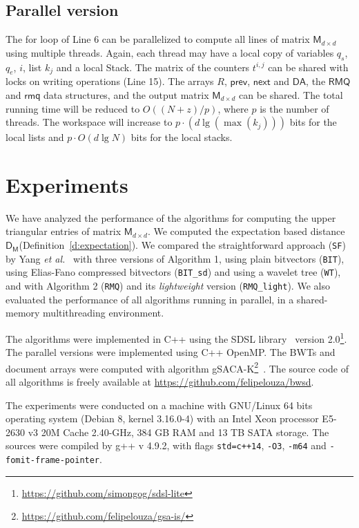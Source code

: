 \documentclass{elsarticle}
\newcommand{\DA}{\ensuremath{\mathsf{DA}}\xspace}
\newcommand{\etal}{{\it et al.}\xspace}
\newcommand{\proc}{\ensuremath{p}\xspace}
\def\gSACAK{{\sf gSACA-K}\xspace}
\newcommand{\DM}{\ensuremath{\mathsf{D_M}}\xspace}
\newcommand{\Md}{\ensuremath{\mathsf{M}}\xspace}
\newcommand{\RMQ}{\ensuremath{\mathsf{RMQ}}\xspace}
\newcommand{\rmq}{\ensuremath{\mathsf{rmq}}\xspace}
\newcommand{\Prev}{\ensuremath{\mathsf{prev}}\xspace}
\newcommand{\Next}{\ensuremath{\mathsf{next}}\xspace}
\newcommand{\st}{\texttt{SF}\xspace}
\newcommand{\bit}{\texttt{BIT}\xspace}
\newcommand{\bitsd}{\texttt{BIT\_sd}\xspace}
\newcommand{\wt}{\texttt{WT}\xspace}
\newcommand{\gog}{\texttt{RMQ\_light}\xspace}
\newcommand{\gognz}{\texttt{RMQ}\xspace}
\begin{document}
\subsection{Parallel version}\label{s:par2}

The for loop of Line 6 can be parallelized to compute all lines of
matrix $\Md_{d\times d}$ using multiple threads.
Again, each thread may have a local copy of variables $q_s$, $q_e$, $i$, list $k_j$ and a local Stack.
The matrix of the counters $t^{i,j}$ can be shared with locks on writing operations (Line 15).
The arrays $R$, \Prev, \Next and \DA, the \RMQ and \rmq data structures, and the
output matrix $\Md_{d\times d}$ can be shared.
The total running time will be reduced to $O((N+z)/\proc)$, where \proc is
the number of threads.
The workspace will increase to $\proc \cdot (d \lg (\max(k_j)))$ bits for the local lists
and $\proc \cdot O(d \lg N)$ bits for the local stacks.


\section{Experiments}\label{s:experiments}

We have analyzed the performance of the algorithms for
computing the upper triangular entries of matrix $\Md_{d\times d}$.
We computed the expectation based distance \DM (Definition~\ref{d:expectation}).
We compared the straightforward approach (\st)
by Yang \etal~\cite{Yang2010b} with
three versions of Algorithm 1, using plain bitvectors
(\bit), using Elias-Fano compressed bitvectors (\bitsd) and using a wavelet
tree (\wt), and with Algorithm 2 (\gognz) and its {\em lightweight} version (\gog).
We also evaluated the performance of all algorithms running in parallel, in a
shared-memory multithreading environment.

The algorithms were implemented in C++ using the SDSL library~\cite{Gog2014a}
version 2.0\footnote{\url{https://github.com/simongog/sdsl-lite}}.
The parallel versions were implemented using C++ OpenMP.
The BWTs and document arrays were computed with algorithm
\gSACAK\footnote{\url{https://github.com/felipelouza/gsa-is/}}~\cite{Louza2017c}.
The source code of all algorithms is freely available at
\url{https://github.com/felipelouza/bwsd}.

The experiments were conducted on a machine with GNU/Linux 64 bits
operating system (Debian 8, kernel 3.16.0-4) with an Intel Xeon processor
E5-2630 v3 20M Cache 2.40-GHz, 384 GB RAM and 13 TB SATA storage.
The sources were compiled by g++ v 4.9.2, with flags
\texttt{std=c++14}, \texttt{-O3}, \texttt{-m64} and
\texttt{-fomit-frame-pointer}.
\end{document}
